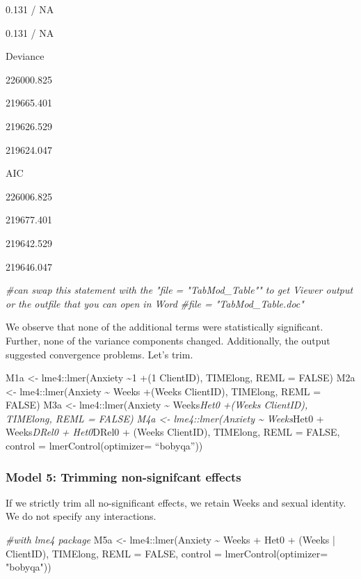 \documentclass[
  english,
]{book}
\newenvironment{Shaded}{\begin{snugshade}}{\end{snugshade}}
\newcommand{\AttributeTok}[1]{\textcolor[rgb]{0.77,0.63,0.00}{#1}}
\newcommand{\CommentTok}[1]{\textcolor[rgb]{0.56,0.35,0.01}{\textit{#1}}}
\newcommand{\ConstantTok}[1]{\textcolor[rgb]{0.00,0.00,0.00}{#1}}
\newcommand{\FunctionTok}[1]{\textcolor[rgb]{0.00,0.00,0.00}{#1}}
\newcommand{\NormalTok}[1]{#1}
\newcommand{\OtherTok}[1]{\textcolor[rgb]{0.56,0.35,0.01}{#1}}
\newcommand{\SpecialCharTok}[1]{\textcolor[rgb]{0.00,0.00,0.00}{#1}}
\newcommand{\StringTok}[1]{\textcolor[rgb]{0.31,0.60,0.02}{#1}}
\begin{document}
0.131 / NA

0.131 / NA

Deviance

226000.825

219665.401

219626.529

219624.047

AIC

226006.825

219677.401

219642.529

219646.047

\begin{Shaded}
\begin{Highlighting}[]
\CommentTok{\#can swap this statement with the "file = "TabMod\_Table"" to get Viewer output or the outfile that you can open in Word}
\CommentTok{\#file = "TabMod\_Table.doc"}
\end{Highlighting}
\end{Shaded}

We observe that none of the additional terms were statistically significant. Further, none of the variance components changed. Additionally, the output suggested convergence problems. Let's trim.

M1a \textless- lme4::lmer(Anxiety \textasciitilde1 +(1 \textbar{} ClientID), TIMElong, REML = FALSE)
M2a \textless- lme4::lmer(Anxiety \textasciitilde{} Weeks +(Weeks \textbar{} ClientID), TIMElong, REML = FALSE)
M3a \textless- lme4::lmer(Anxiety \textasciitilde{} Weeks\emph{Het0 +(Weeks \textbar{} ClientID), TIMElong, REML = FALSE)
M4a \textless- lme4::lmer(Anxiety \textasciitilde{} Weeks}Het0 + Weeks\emph{DRel0 + Het0}DRel0 + (Weeks \textbar{} ClientID), TIMElong, REML = FALSE, control = lmerControl(optimizer= ``bobyqa''))

\hypertarget{model-5-trimming-non-signifcant-effects}{%
\subsubsection{Model 5: Trimming non-signifcant effects}\label{model-5-trimming-non-signifcant-effects}}

If we strictly trim all no-significant effects, we retain Weeks and sexual identity. We do not specify any interactions.

\begin{Shaded}
\begin{Highlighting}[]
\CommentTok{\#with lme4 package}
\NormalTok{M5a }\OtherTok{\textless{}{-}}\NormalTok{ lme4}\SpecialCharTok{::}\FunctionTok{lmer}\NormalTok{(Anxiety }\SpecialCharTok{\textasciitilde{}}\NormalTok{ Weeks }\SpecialCharTok{+}\NormalTok{ Het0 }\SpecialCharTok{+}\NormalTok{ (Weeks }\SpecialCharTok{|}\NormalTok{ ClientID), TIMElong, }\AttributeTok{REML =} \ConstantTok{FALSE}\NormalTok{, }\AttributeTok{control =} \FunctionTok{lmerControl}\NormalTok{(}\AttributeTok{optimizer=} \StringTok{"bobyqa"}\NormalTok{))}
\end{Highlighting}
\end{Shaded}
\end{document}
